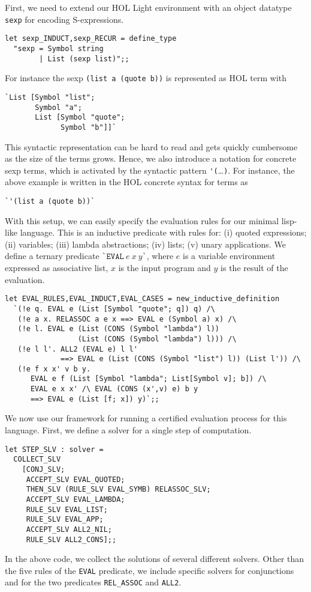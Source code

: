 First, we need to extend our HOL Light environment with an object
datatype \verb|sexp| for encoding S-expressions.
\begin{verbatim}
let sexp_INDUCT,sexp_RECUR = define_type
  "sexp = Symbol string
        | List (sexp list)";;
\end{verbatim}
For instance the sexp \verb|(list a (quote b))| is represented as HOL
term with
\begin{verbatim}
`List [Symbol "list";
       Symbol "a";
       List [Symbol "quote";
             Symbol "b"]]`
\end{verbatim}
This syntactic representation can be hard to read and gets quickly
cumbersome as the size of the terms grows.  Hence, we also introduce a
notation for concrete sexp terms, which is activated by the syntactic
pattern \verb|'(|\ldots\verb|)|.  For instance, the above example
is written in the HOL concrete syntax for terms as
\begin{verbatim}
`'(list a (quote b))`
\end{verbatim}

With this setup, we can easily specify the evaluation rules for our
minimal lisp-like language.  This is an inductive predicate with rules
for: (i) quoted expressions; (ii) variables; (iii) lambda
abstractions; (iv) lists; (v) unary applications.  We define a ternary
predicate \verb|`|$\mathtt{EVAL}\ e\ x\ y\mathtt{}$\verb|`|, where $e$
is a variable environment expressed as associative list, $x$ is the
input program and $y$ is the result of the evaluation.
\begin{verbatim}
let EVAL_RULES,EVAL_INDUCT,EVAL_CASES = new_inductive_definition
  `(!e q. EVAL e (List [Symbol "quote"; q]) q) /\
   (!e a x. RELASSOC a e x ==> EVAL e (Symbol a) x) /\
   (!e l. EVAL e (List (CONS (Symbol "lambda") l))
                 (List (CONS (Symbol "lambda") l))) /\
   (!e l l'. ALL2 (EVAL e) l l'
             ==> EVAL e (List (CONS (Symbol "list") l)) (List l')) /\
   (!e f x x' v b y.
      EVAL e f (List [Symbol "lambda"; List[Symbol v]; b]) /\
      EVAL e x x' /\ EVAL (CONS (x',v) e) b y
      ==> EVAL e (List [f; x]) y)`;;
\end{verbatim}

We now use our framework for running a certified evaluation process
for this language.  First, we define a solver for a single step of
computation.
\begin{verbatim}
let STEP_SLV : solver =
  COLLECT_SLV
    [CONJ_SLV;
     ACCEPT_SLV EVAL_QUOTED;
     THEN_SLV (RULE_SLV EVAL_SYMB) RELASSOC_SLV;
     ACCEPT_SLV EVAL_LAMBDA;
     RULE_SLV EVAL_LIST;
     RULE_SLV EVAL_APP;
     ACCEPT_SLV ALL2_NIL;
     RULE_SLV ALL2_CONS];;
\end{verbatim}
In the above code, we collect the solutions of several different
solvers.  Other than the five rules of the \verb|EVAL| predicate, we
include specific solvers for conjunctions and for the two predicates
\verb|REL_ASSOC| and \verb|ALL2|.

